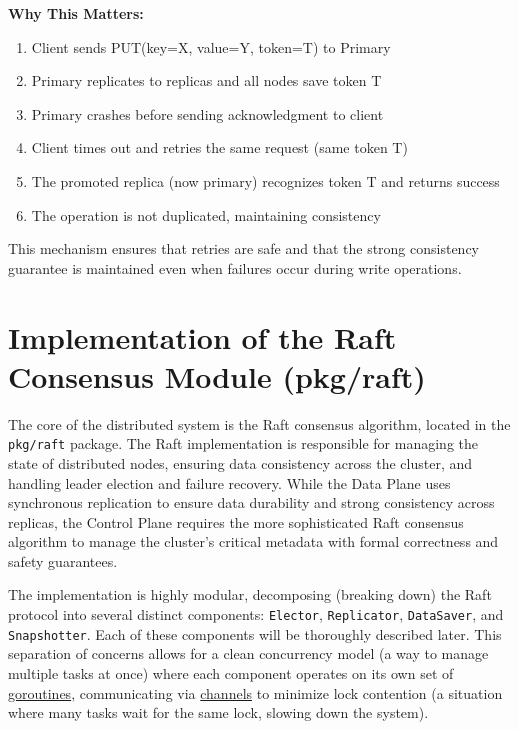 \documentclass[shortabstract]{iithesis}
\begin{document}
\textbf{Why This Matters:}
\begin{enumerate}
    \item Client sends PUT(key=X, value=Y, token=T) to Primary
    \item Primary replicates to replicas and all nodes save token T
    \item Primary crashes before sending acknowledgment to client
    \item Client times out and retries the same request (same token T)
    \item The promoted replica (now primary) recognizes token T and returns success
    \item The operation is not duplicated, maintaining consistency
\end{enumerate}

This mechanism ensures that retries are safe and that the strong consistency guarantee is maintained even when failures occur during write operations.
 




\chapter{Implementation of the Raft Consensus Module (pkg/raft)}
The core of the distributed system is the Raft consensus algorithm, located in the \texttt{pkg/raft} package. The Raft implementation is responsible for managing the state of distributed nodes, ensuring data consistency across the cluster, and handling leader election and failure recovery. While the Data Plane uses synchronous replication to ensure data durability and strong consistency across replicas, the Control Plane requires the more sophisticated Raft consensus algorithm to manage the cluster's critical metadata with formal correctness and safety guarantees.

The implementation is highly modular, decomposing (breaking down) the Raft protocol into several distinct components: \texttt{Elector}, \texttt{Replicator}, \texttt{DataSaver}, and \texttt{Snapshotter}. Each of these components will be thoroughly described later. This separation of concerns allows for a clean concurrency model (a way to manage multiple tasks at once) where each component operates on its own set of \hyperref[def:goroutine]{goroutines}, communicating via \hyperref[def:channel]{channels} to minimize lock contention (a situation where many tasks wait for the same lock, slowing down the system).
\end{document}
